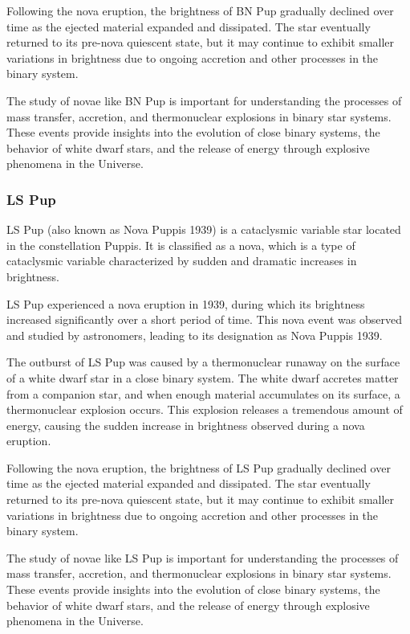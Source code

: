 Following the nova eruption, the brightness of BN Pup gradually declined over time as the ejected material expanded and dissipated. The star eventually returned to its pre-nova quiescent state, but it may continue to exhibit smaller variations in brightness due to ongoing accretion and other processes in the binary system.

The study of novae like BN Pup is important for understanding the processes of mass transfer, accretion, and thermonuclear explosions in binary star systems. These events provide insights into the evolution of close binary systems, the behavior of white dwarf stars, and the release of energy through explosive phenomena in the Universe.


\subsubsection*{ LS Pup }
LS Pup (also known as Nova Puppis 1939) is a cataclysmic variable star located in the constellation Puppis. It is classified as a nova, which is a type of cataclysmic variable characterized by sudden and dramatic increases in brightness.

LS Pup experienced a nova eruption in 1939, during which its brightness increased significantly over a short period of time. This nova event was observed and studied by astronomers, leading to its designation as Nova Puppis 1939.

The outburst of LS Pup was caused by a thermonuclear runaway on the surface of a white dwarf star in a close binary system. The white dwarf accretes matter from a companion star, and when enough material accumulates on its surface, a thermonuclear explosion occurs. This explosion releases a tremendous amount of energy, causing the sudden increase in brightness observed during a nova eruption.

Following the nova eruption, the brightness of LS Pup gradually declined over time as the ejected material expanded and dissipated. The star eventually returned to its pre-nova quiescent state, but it may continue to exhibit smaller variations in brightness due to ongoing accretion and other processes in the binary system.

The study of novae like LS Pup is important for understanding the processes of mass transfer, accretion, and thermonuclear explosions in binary star systems. These events provide insights into the evolution of close binary systems, the behavior of white dwarf stars, and the release of energy through explosive phenomena in the Universe.



